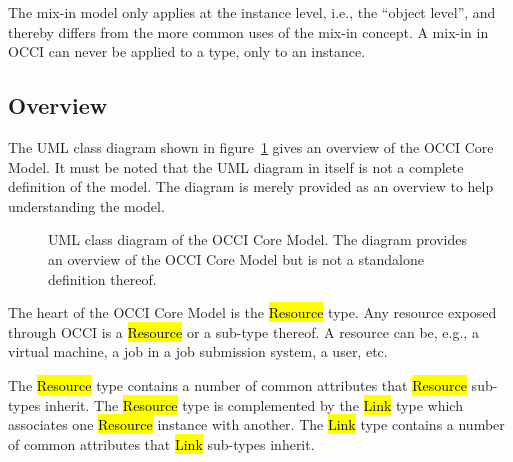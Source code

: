 \documentclass[10pt,a4paper]{article}
\begin{document}
The mix-in model only applies at the instance level, i.e., the ``object
level'', and thereby differs from the more common uses of the mix-in
concept. A mix-in in OCCI can never be applied to a type, only to an
instance.

\subsection{Overview}

The UML class diagram shown in figure~\ref{fig:occi_model} gives an
overview of the OCCI Core Model. It must be noted that the UML diagram
in itself is not a complete definition of the model. The diagram is
merely provided as an overview to help understanding the model.

\begin{figure}[!h]
  {\centering {} \par}
  \caption{UML class diagram of the OCCI Core Model. The diagram
    provides an overview of the OCCI Core Model but is not a
    standalone definition thereof.}
  \label{fig:occi_model}
\end{figure}

The heart of the OCCI Core Model is the \hl{Resource} type. Any
resource exposed through OCCI is a \hl{Resource} or a sub-type
thereof.  A resource can be, e.g., a virtual machine, a job in a job
submission system, a user, etc.

The \hl{Resource} type contains a number of common attributes that
\hl{Resource} sub-types inherit. The \hl{Resource} type is
complemented by the \hl{Link} type which associates one \hl{Resource}
instance with another.
%
The \hl{Link} type contains a number of common attributes that
\hl{Link} sub-types inherit.
\end{document}
